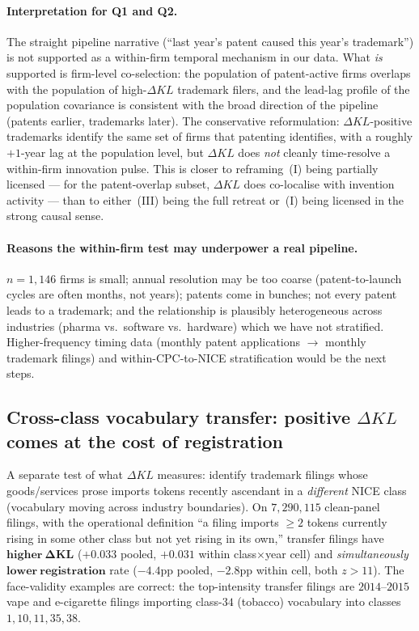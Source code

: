 \documentclass[11pt]{article}
\newcommand{\dkl}{\Delta KL}
\begin{document}
\paragraph{Interpretation for Q1 and Q2.} The straight pipeline
narrative (``last year's patent caused this year's trademark'') is
not supported as a within-firm temporal mechanism in our data. What
\emph{is} supported is firm-level co-selection: the population of
patent-active firms overlaps with the population of high-$\dkl$
trademark filers, and the lead-lag profile of the population
covariance is consistent with the broad direction of the pipeline
(patents earlier, trademarks later). The conservative
reformulation: $\dkl$-positive trademarks identify the same set of
firms that patenting identifies, with a roughly $+1$-year lag at the
population level, but $\dkl$ does \emph{not} cleanly time-resolve a
within-firm innovation pulse. This is closer to reframing~(I) being
partially licensed --- for the patent-overlap subset, $\dkl$ does
co-localise with invention activity --- than to either~(III) being
the full retreat or~(I) being licensed in the strong causal sense.

\paragraph{Reasons the within-firm test may underpower a real
pipeline.} $n = 1{,}146$ firms is small; annual resolution may be
too coarse (patent-to-launch cycles are often months, not years);
patents come in bunches; not every patent leads to a trademark; and
the relationship is plausibly heterogeneous across industries
(pharma vs.\ software vs.\ hardware) which we have not stratified.
Higher-frequency timing data (monthly patent applications $\to$
monthly trademark filings) and within-CPC-to-NICE stratification
would be the next steps.

\subsection*{Cross-class vocabulary transfer: positive $\dkl$ comes at the cost of registration}

A separate test of what $\dkl$ measures: identify trademark filings
whose goods/services prose imports tokens recently ascendant in a
\emph{different} NICE class (vocabulary moving across industry
boundaries). On $7{,}290{,}115$ clean-panel filings, with the
operational definition ``a filing imports $\geq 2$ tokens currently
rising in some other class but not yet rising in its own,'' transfer
filings have $\mathbf{higher\ \dkl}$ ($+0.033$ pooled, $+0.031$ within
class$\times$year cell) and \emph{simultaneously}
$\mathbf{lower\ registration}$ rate ($-4.4$pp pooled, $-2.8$pp within
cell, both $z > 11$). The face-validity examples are correct: the
top-intensity transfer filings are $2014$--$2015$ vape and
e-cigarette filings importing class-$34$ (tobacco) vocabulary into
classes $1, 10, 11, 35, 38$.
\end{document}
